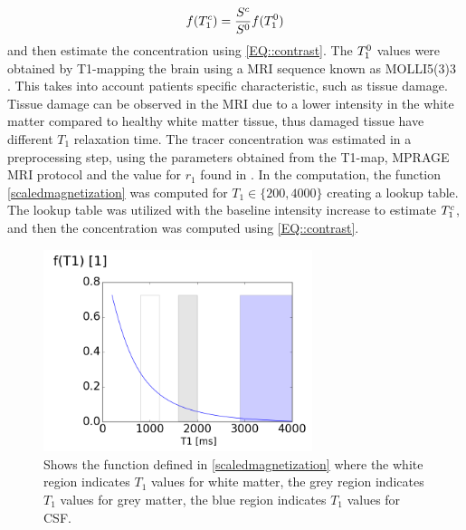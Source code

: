 \documentclass[11pt,a4paper]{article}
\begin{document}
\begin{equation}
f ( T_{1}\sp{c} ) = \frac{S\sp{c}}{S\sp{0}} f(T_{1}\sp{0}) 
\end{equation}
and then estimate the concentration using \eqref{EQ::contrast}. The $T_{1}\sp{0}$ values were obtained by T1-mapping the brain using a MRI sequence known as MOLLI5(3)3 \cite{TAYLOR201667}. This takes into account patients specific characteristic, such as tissue damage. Tissue damage can be observed in the MRI due to a lower intensity in the white matter compared to healthy white matter tissue, thus damaged tissue have different $T_1$ relaxation time. 
The tracer concentration was estimated in a preprocessing step, using the parameters obtained from the T1-map, MPRAGE MRI protocol \cite{eidevalnes} and the value for $r_1$ found in \cite{pmid16230904}. In the computation, the function \eqref{scaledmagnetization} was computed for $ T_1\in \lbrace 200, 4000 \rbrace$ creating a lookup table. The lookup table was utilized with the baseline intensity increase to estimate $T_1\sp{c}$, and then the concentration was computed using \eqref{EQ::contrast}.  

\begin{figure}
\centering
\includegraphics[width=0.70\textwidth]{T1function.png} 
\caption{Shows the  function defined in \eqref{scaledmagnetization} where the white region indicates $T_1$ values for white matter, the grey region indicates $T_1$ values for grey matter, the blue region indicates $T_1$ values for CSF.  }
\label{figureF} 
\end{figure}
\end{document}
